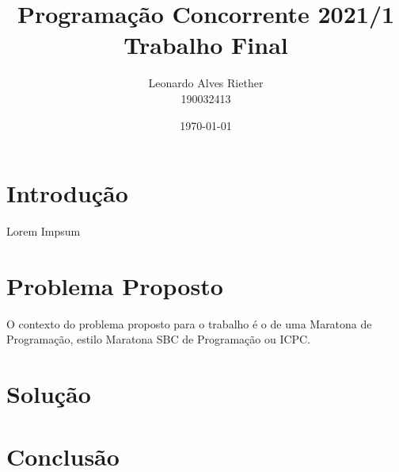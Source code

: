 \documentclass[11pt]{article}
\title{ Programação Concorrente 2021/1 \\
\Large{ Trabalho Final }}
\author{ Leonardo Alves Riether \\ 190032413 }
\date{\today}
\begin{document}
\maketitle
\pagebreak



\section{Introdução}

Lorem Impsum

\section{Problema Proposto}
O contexto do problema proposto para o trabalho é o de uma Maratona de Programação, estilo Maratona SBC de Programação\cite{maratonasbc} ou ICPC\cite{icpc}.

\section{Solução}
\section{Conclusão}

\medskip
\printbibliography
\end{document}
